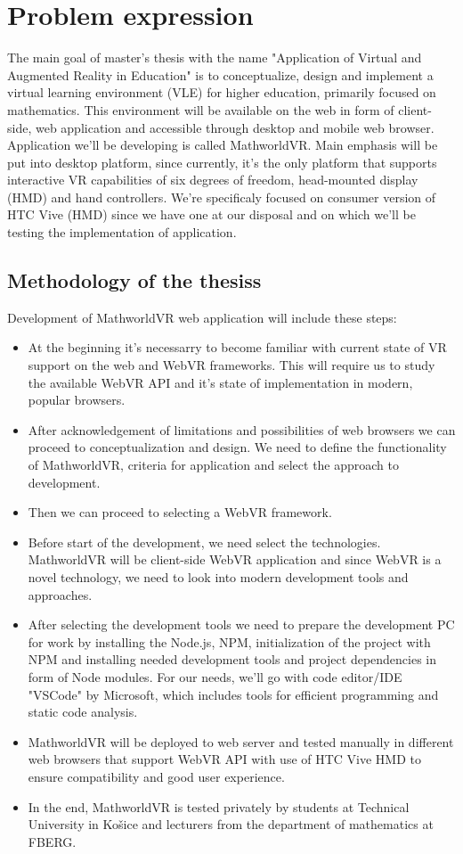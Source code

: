 \section{Problem expression}
The main goal of master's thesis with the name "Application of Virtual and Augmented Reality in Education" is to conceptualize, design and implement a virtual learning environment (VLE) for higher education, primarily focused on mathematics. This environment will be available on the web in form of client-side, web application and accessible through desktop and mobile web browser. Application we'll be developing is called MathworldVR. Main emphasis will be put into desktop platform, since currently, it's the only platform that supports interactive VR capabilities of six degrees of freedom, head-mounted display (HMD) and hand controllers. We're specificaly focused on consumer version of HTC Vive (HMD) since we have one at our disposal and on which we'll be testing the implementation of application.

\subsection{Methodology of the thesiss}
Development of MathworldVR web application will include these steps:
\begin{itemize}
\item{At the beginning it's necessarry to become familiar with current state of VR support on the web and WebVR frameworks. This will require us to study the available WebVR API and it's state of implementation in modern, popular browsers.}
\item{After acknowledgement of limitations and possibilities of web browsers we can proceed to conceptualization and design. We need to define the functionality of MathworldVR, criteria for application and select the approach to development.}
\item{Then we can proceed to selecting a WebVR framework.}
\item{Before start of the development, we need select the technologies. MathworldVR will be client-side WebVR application and since WebVR is a novel technology, we need to look into modern development tools and approaches.}
\item{After selecting the development tools we need to prepare the development PC for work by installing the Node.js, NPM, initialization of the project with NPM and installing needed development tools and project dependencies in form of Node modules. For our needs, we'll go with code editor/IDE "VSCode" by Microsoft, which includes tools for efficient programming and static code analysis.}
\item{MathworldVR will be deployed to web server and tested manually in different web browsers that support WebVR API with use of HTC Vive HMD to ensure compatibility and good user experience.}
\item{In the end, MathworldVR is tested privately by students at Technical University in Košice and lecturers from the department of mathematics at FBERG.}
\end{itemize}
